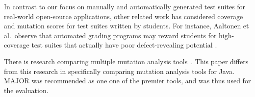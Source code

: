 In contrast to our focus on manually and automatically generated test suites for real-world open-source applications,
other related work has considered coverage and mutation scores for test suites written by students. For instance,
Aaltonen et al.\ observe that automated grading programs may reward students for high-coverage test suites that actually
have poor defect-revealing potential \cite{aaltonen:2010:mav:1869542.1869567}.


There is research comparing multiple mutation analysis tools~\cite{ComparingAutomatedMutationTools:2013}. This paper differs from this research in specifically comparing mutation analysis tools for Java. MAJOR was recommended as one one of the premier tools, and was thus used for the evaluation.
